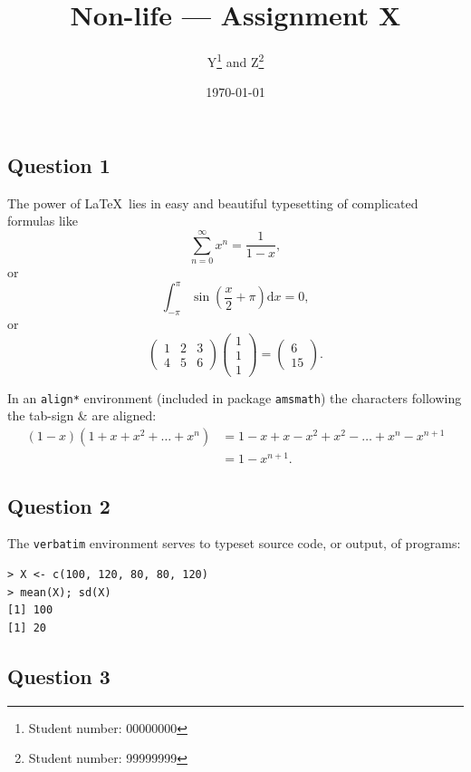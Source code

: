 \documentclass[11pt]{article}
\title{Non-life --- Assignment X}  %
\author{
  Y\footnote{Student number: 00000000}
  \quad and \quad
  Z\footnote{Student number: 99999999}
}
\date{\today}
\begin{document}
\maketitle

\subsection*{Question 1}

The power of \LaTeX~lies in easy and beautiful typesetting of complicated formulas like
\[
   \sum_{n=0}^\infty x^n = \frac{1}{1-x},
\]
or
\[
   \int_{-\pi}^{\pi} \sin \left(\frac{x}{2}+\pi\right) \text{d}x = 0,
\]
or
\[
  \begin{pmatrix}
    1 & 2 & 3 \\ %
    4 & 5 & 6
  \end{pmatrix}
  \begin{pmatrix}
    1 \\ 1 \\ 1
  \end{pmatrix}
  =
  \begin{pmatrix}
    6 \\ 15
  \end{pmatrix}.
\]

In an \verb!align*! environment (included in package \verb!amsmath!) the characters following the tab-sign \& are aligned:
\begin{align*}
  ( 1 - x ) ( 1 + x + x^2 + \ldots + x^n )
  & = 
  1 - x + x - x^2 + x^2 - \ldots + x^n - x^{n+1}
  \\ %
  & =
  1 - x^{n+1}.
\end{align*}


\subsection*{Question 2}

The \verb!verbatim! environment serves to typeset source code, or output, of programs:

\begin{verbatim}
> X <- c(100, 120, 80, 80, 120)
> mean(X); sd(X)
[1] 100
[1] 20
\end{verbatim}

\newpage %
\subsection*{Question 3}
\end{document}

